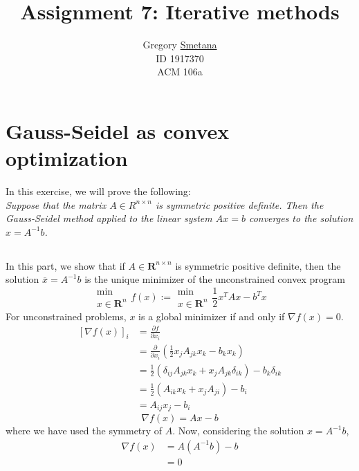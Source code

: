 \documentclass[11pt]{article} %
\title{Assignment 7: Iterative methods}
\author{ Gregory \uline{Smetana} \\ID 1917370 \\ ACM 106a }
\begin{document}
\maketitle


\section{Gauss-Seidel as convex optimization}
In this exercise, we will prove the following:\\

\emph{Suppose that the matrix $A \in R^{n \times n}$ is symmetric positive definite. Then the Gauss-Seidel method applied to the linear system $Ax = b$ converges to the solution $x = A^{-1} b$.}

\subsection{} %
In this part, we show that if $A \in \mathbf{R}^{n \times n}$ is symmetric positive definite, then the solution  $\overline{x} = A^{-1} b$ is the unique minimizer of the unconstrained convex program
\begin{equation}
\substack{\min \\x \in \mathbf{R}^n}f(x) :=\substack{\min \\x \in \mathbf{R}^n}\frac{1}{2}x^T A x - b^T x
\label{eq:convex}
\end{equation}
For unconstrained problems, $x$ is a global minimizer if and only if $\nabla f(x) =0$.
\begin{equation}
\begin{split}
[ \nabla f(x) ]_i & = \frac{ \partial f}{\partial x_i} \\
& = \frac{\partial }{\partial x_i} \left ( \frac{1}{2}x_j A_{jk}x_k - b_k x_k \right )\\
& =  \frac{1}{2} \left ( \delta_{ij}A_{jk} x_k + x_j A_{jk}\delta_{ik} \right ) - b_k \delta_{ik} \\
& = \frac{1}{2} \left ( A_{ik} x_k + x_j A_{ji} \right ) - b_i \\
& = A_{ij}x_j - b_i
\end{split}
\end{equation}
\begin{equation}
\nabla f(x) =Ax-b
\end{equation} 
where we have used the symmetry of $A$. Now, considering the solution  $x = A^{-1} b$,
\begin{equation}
\begin{split}
\nabla f(x)  & = A (A^{-1} b) -b \\
&=0
\end{split}
\end{equation}
\end{document}
